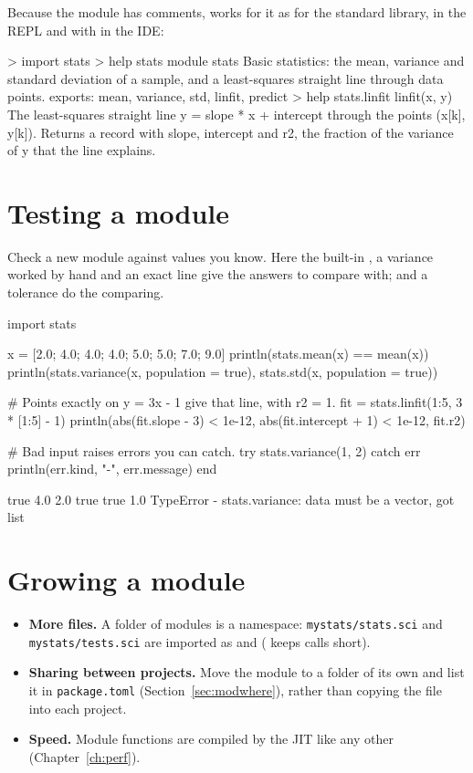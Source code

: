 \documentclass[11pt,a4paper,openany]{report}
\begin{document}
{{Because the module has \code{##} comments,  works for it as for the
standard library, in the REPL and with  in the IDE:

\begin{axonrepl}
> import stats
> help stats
module stats
  Basic statistics: the mean, variance and standard deviation of a sample,
  and a least-squares straight line through data points.
  exports: mean, variance, std, linfit, predict
> help stats.linfit
linfit(x, y)
  The least-squares straight line y = slope * x + intercept through the
  points (x[k], y[k]). Returns a record with slope, intercept and r2, the
  fraction of the variance of y that the line explains.
\end{axonrepl}

\section{Testing a module}

Check a new module against values you know. Here the built-in , a
variance worked by hand and an exact line give the answers to compare with;
\code{==} and a tolerance do the comparing.

\begin{axon}
import stats

x = [2.0; 4.0; 4.0; 4.0; 5.0; 5.0; 7.0; 9.0]
println(stats.mean(x) == mean(x))
println(stats.variance(x, population = true), stats.std(x, population = true))

# Points exactly on y = 3x - 1 give that line, with r2 = 1.
fit = stats.linfit(1:5, 3 * [1:5] - 1)
println(abs(fit.slope - 3) < 1e-12, abs(fit.intercept + 1) < 1e-12, fit.r2)

# Bad input raises errors you can catch.
try
  stats.variance({1, 2})
catch err
  println(err.kind, "-", err.message)
end
\end{axon}
\begin{axonout}
true
4.0 2.0
true true 1.0
TypeError - stats.variance: data must be a vector, got list
\end{axonout}

\section{Growing a module}

\begin{itemize}
\item \textbf{More files.} A folder of modules is a namespace:
  \texttt{mystats/stats.sci} and \texttt{mystats/tests.sci} are imported as
   and 
  ( keeps calls short).
\item \textbf{Sharing between projects.} Move the module to a folder of its
  own and list it in \texttt{package.toml}
  (Section~\ref{sec:modwhere}), rather than copying the file into each
  project.
\item \textbf{Speed.} Module functions are compiled by the JIT like any other
  (Chapter~\ref{ch:perf}).
\end{itemize}

}}
\end{document}

